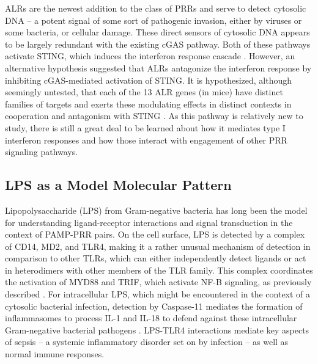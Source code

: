 ALRs are the newest addition to the class of PRRs and serve to detect cytosolic DNA -- a potent signal of some sort of pathogenic invasion, either by viruses or some bacteria, or cellular damage. These direct sensors of cytosolic DNA appears to be largely redundant with the existing cGAS pathway. Both of these pathways activate STING, which induces the interferon response cascade \citep{Gray2016}. However, an alternative hypothesis suggested that ALRs antagonize the interferon response by inhibiting cGAS-mediated activation of STING. It is hypothesized, although seemingly untested, that each of the 13 ALR genes (in mice) have distinct families of targets and exerts these modulating effects in distinct contexts in cooperation and antagonism with STING \citep{Nakaya2017}. As this pathway is relatively new to study, there is still a great deal to be learned about how it mediates type I interferon responses and how those interact with engagement of other PRR signaling pathways.

\subsection{LPS as a Model Molecular Pattern}\label{lps}

Lipopolysaccharide (LPS) from Gram-negative bacteria has long been the model for understanding ligand-receptor interactions and signal transduction in the context of PAMP-PRR pairs. On the cell surface, LPS is detected by a complex of CD14, MD2, and TLR4, making it a rather unusual mechanism of detection in comparison to other TLRs, which can either independently detect ligands or act in heterodimers with other members of the TLR family. This complex coordinates the activation of MYD88 and TRIF, which activate NF-\textkappa B signaling, as previously described \citep{Miller2005, Beutler2000}. For intracellular LPS, which might be encountered in the context of a cytosolic bacterial infection, detection by Caspase-11 mediates the formation of inflammasomes to process IL-1\textbeta{} and IL-18 to defend against these intracellular Gram-negative bacterial pathogens \citep{Wright1990, Triantafilou2002, Kawai1999, Vasudevan2022, Kaguyaki2013, Rathinam2019, Shi2014}. LPS-TLR4 interactions mediate key aspects of sepsis -- a systemic inflammatory disorder set on by infection -- as well as normal immune responses.

